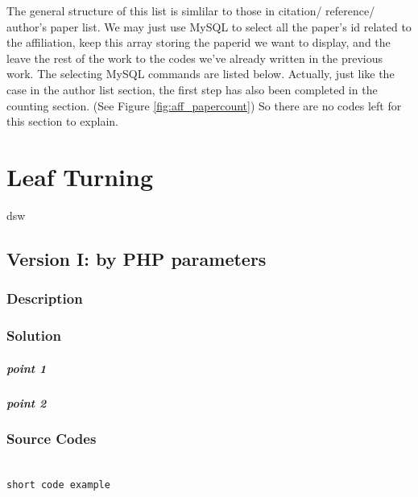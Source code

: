 \documentclass{book}
\begin{document}
The general structure of this list is simlilar to those in citation/ reference/ author's paper list. We may just use MySQL to select all the paper's id related to the affiliation, keep this array storing the paperid we want to display, and the leave the rest of the work to the codes we've already written in the previous work. The selecting MySQL commands are listed below. Actually, just like the case in the author list section, the first step has also been completed in the counting section. (See Figure \ref{fig:aff_papercount}) So there are no codes left for this section to explain.

\chapter{Leaf Turning}

dsw

\section{Version I: by PHP parameters}

\subsection{Description}

\subsection{Solution}

\paragraph{point 1}

\paragraph{point 2}

\subsection{Source Codes}

\begin{minipage}[r]{15em}
\begin{verbatim}

short code example

\end{verbatim}
\end{minipage}
\end{document}
